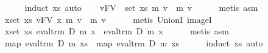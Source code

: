 \begin{isabellebody}
\ \ \ \ \isamarkupfalse%
\ {}induct\ xs{}\ auto{}\isanewline
\ \ \isamarkupfalse%
\ {}{}v{}{}{}FV\ {}\ set\ xs{}{}\ m{}\ v\ {}\ m{}\ v{}\isanewline
\ \ \ \ \isamarkupfalse%
\ {}metis\ asm{}{}\isanewline
\ \ \isamarkupfalse%
\ {}{}x{}set\ xs{}\ {}{}v{}FV\ x{}\ m{}\ v\ {}\ m{}\ v{}{}\isanewline
\ \ \ \ \isamarkupfalse%
\ {}metis\ UnionI\ imageI{}\isanewline
\ \ \isamarkupfalse%
\ {}{}x{}set\ xs{}\ eval{}trm\ D\ m{}\ x\ {}\ eval{}trm\ D\ m{}\ x{}\isanewline
\ \ \ \ \isamarkupfalse%
\ {}metis\ asm{}{}\isanewline
\ \ \isamarkupfalse%
\ {}map\ {}eval{}trm\ D\ m{}{}\ xs\ {}\ map\ {}eval{}trm\ D\ m{}{}\ xs{}\isanewline
\ \ \ \ \isamarkupfalse%
\ {}induct\ xs{}\ auto{}\isanewline

\end{isabellebody}
